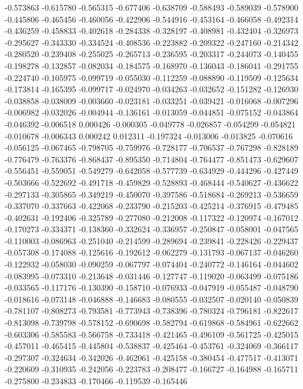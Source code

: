 -0.573863
-0.615780
-0.565315
-0.677406
-0.638709
-0.588493
-0.589039
-0.578900
-0.445806
-0.465456
-0.460056
-0.422906
-0.544916
-0.453164
-0.466058
-0.492314
-0.436259
-0.458833
-0.402618
-0.284338
-0.328197
-0.408981
-0.432404
-0.326973
-0.295627
-0.343330
-0.334524
-0.408536
-0.223882
-0.209322
-0.247160
-0.214342
-0.280520
-0.239408
-0.255025
-0.265713
-0.236595
-0.203317
-0.244073
-0.140455
-0.198278
-0.132857
-0.082034
-0.184575
-0.168970
-0.136043
-0.186041
-0.291755
-0.224740
-0.105975
-0.099719
-0.055030
-0.112259
-0.088890
-0.119509
-0.125634
-0.173814
-0.165395
-0.099717
-0.024970
-0.034263
-0.032652
-0.151282
-0.126930
-0.038858
-0.038009
-0.003660
-0.023181
-0.033251
-0.039421
-0.016068
-0.007296
-0.006982
-0.032026
-0.004944
-0.136161
-0.013059
-0.044851
-0.075152
-0.043864
-0.046392
-0.006518
0.000426
-0.000305
-0.049778
-0.026857
-0.054299
-0.054821
-0.010678
-0.006343
0.000242
0.012311
-0.197324
-0.013006
-0.013825
-0.070616
-0.056125
-0.067465
-0.798705
-0.759976
-0.728177
-0.706537
-0.767298
-0.828189
-0.776479
-0.763376
-0.868437
-0.895350
-0.714804
-0.764477
-0.851473
-0.629607
-0.556451
-0.559051
-0.549279
-0.642058
-0.577739
-0.634929
-0.444296
-0.427449
-0.503666
-0.522692
-0.491718
-0.459829
-0.528893
-0.468444
-0.540627
-0.436622
-0.297133
-0.305865
-0.349219
-0.450070
-0.397586
-0.518684
-0.269213
-0.536659
-0.337070
-0.337663
-0.422068
-0.233790
-0.215203
-0.425214
-0.376915
-0.479485
-0.402631
-0.192406
-0.325789
-0.277080
-0.212008
-0.117322
-0.120974
-0.167012
-0.170273
-0.334371
-0.138360
-0.332624
-0.336957
-0.250847
-0.058001
-0.047565
-0.110003
-0.086963
-0.251040
-0.214599
-0.289694
-0.239841
-0.228426
-0.229437
-0.057308
-0.174088
-0.125616
-0.192612
-0.062279
-0.131793
-0.067137
-0.046260
-0.122932
-0.058030
-0.090259
-0.067797
-0.074404
-0.240772
-0.146164
-0.044602
-0.083995
-0.073310
-0.213648
-0.031446
-0.127747
-0.119020
-0.063499
-0.075186
-0.033565
-0.117176
-0.130390
-0.158710
-0.076933
-0.047919
-0.055487
-0.048790
-0.018616
-0.073148
-0.046888
-0.146683
-0.080555
-0.032507
-0.020140
-0.050839
-0.781107
-0.808273
-0.793581
-0.773943
-0.738396
-0.780324
-0.796181
-0.822617
-0.813098
-0.739798
-0.578152
-0.690698
-0.582794
-0.619868
-0.584961
-0.622662
-0.603306
-0.585583
-0.566758
-0.733418
-0.421465
-0.496109
-0.561725
-0.425015
-0.457011
-0.465415
-0.445804
-0.538837
-0.425464
-0.453761
-0.324069
-0.366117
-0.297307
-0.324634
-0.342026
-0.462061
-0.425158
-0.380454
-0.477517
-0.413071
-0.220609
-0.310935
-0.242056
-0.223783
-0.208477
-0.166727
-0.164988
-0.165711
-0.275800
-0.234833
-0.170466
-0.119539
-0.165446
